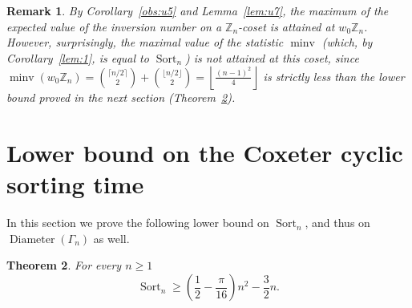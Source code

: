 \documentclass[11pt]{amsart}
\newtheorem{theorem}{Theorem}[section]
\newtheorem{remark}[theorem]{Remark}
\numberwithin{equation}{section}
\newcommand{\todo}[1]{\vspace{5 mm}\par \noindent
\marginpar{\textsc{ToDo}} \framebox{\begin{minipage}[c]{0.95
\textwidth}
 #1 \end{minipage}}\vspace{5 mm}\par}
\newcommand{\ZZ}{{\mathbb {Z}}}
\newcommand{\inv}{{\operatorname{inv}}}
\newcommand{\minv}{{\operatorname{minv}}}
\newcommand{\cwinv}{{\operatorname{cwinv}}}
\newcommand{\dist}{{\operatorname{dist}}}
\newcommand{\D}{{\operatorname{Diameter}}}
\newcommand{\Sort}{{\operatorname{Sort}}}
\begin{document}






\begin{remark}\label{rem:max}
    By Corollary~\ref{obs:u5} and Lemma~\ref{lem:u7}, the maximum of the expected value of the inversion number on a $\ZZ_n$-coset is attained at $w_0 \ZZ_n$. However, surprisingly, the maximal value of the statistic $\minv$ 
    (which, by Corollary~\ref{lem:1}, is equal to $\Sort_n$)
    is not attained at this coset, since %
    $\minv(w_0 \ZZ_n) = \binom{\lceil n/2\rceil}{2} + \binom{\lfloor n/2\rfloor}{2} = \left\lfloor \frac{(n-1)^2}{4} \right\rfloor $ is strictly less than the lower bound proved in the next section (Theorem~\ref{thm:2}). 
\end{remark}


\section{Lower bound on the Coxeter cyclic sorting time}

In this section we prove the following lower bound on $\Sort_n$, and thus on $\D(\Gamma_n)$ as well.

\begin{theorem}\label{thm:2}
    For every $n\ge 1$
    \[
    \Sort_n 
    \ge \left( \frac{1}{2}-\frac{\pi}{16} \right) n^2 -\frac{3}{2} n. %
    \]
\end{theorem}
\end{document}
